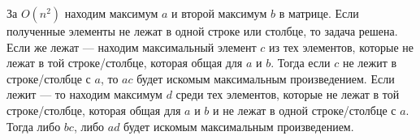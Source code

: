 \documentclass{article}
\begin{document}
За $O(n^2)$ находим максимум $a$ и второй максимум $b$ в матрице. Если полученные элементы не лежат в одной строке или столбце, то задача решена. Если же лежат --- находим максимальный элемент $c$ из тех элементов, которые не лежат в той строке/столбце, которая общая для $a$ и $b$. Тогда если $c$ не лежит в строке/столбце с $a$, то $ac$ будет искомым максимальным произведением. Если лежит --- то находим максимум $d$ среди тех элементов, которые не лежат в той строке/столбце, которая общая для $a$ и $b$ и не лежат в одной строке/столбце с $a$. Тогда либо $bc$, либо $ad$ будет искомым максимальным произведением.
\end{document}
